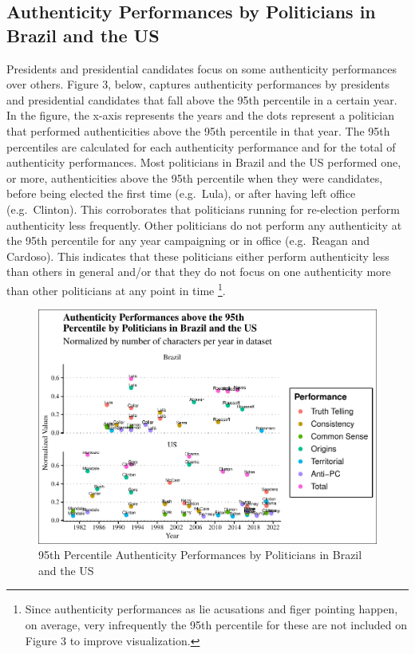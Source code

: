 \documentclass[smallextended]{svjour3}       %
\begin{document}
\hypertarget{authenticity-performances-by-politicians-in-brazil-and-the-us}{%
\subsection{Authenticity Performances by Politicians in Brazil and the
US}\label{authenticity-performances-by-politicians-in-brazil-and-the-us}}

Presidents and presidential candidates focus on some authenticity
performances over others. Figure 3, below, captures authenticity
performances by presidents and presidential candidates that fall above
the 95th percentile in a certain year. In the figure, the x-axis
represents the years and the dots represent a politician that performed
authenticities above the 95th percentile in that year. The 95th
percentiles are calculated for each authenticity performance and for the
total of authenticity performances. Most politicians in Brazil and the
US performed one, or more, authenticities above the 95th percentile when
they were candidates, before being elected the first time (e.g.~Lula),
or after having left office (e.g.~Clinton). This corroborates that
politicians running for re-election perform authenticity less
frequently. Other politicians do not perform any authenticity at the
95th percentile for any year campaigning or in office (e.g.~Reagan and
Cardoso). This indicates that these politicians either perform
authenticity less than others in general and/or that they do not focus
on one authenticity more than other politicians at any point in time
\footnote{ Since authenticity performances as lie acusations and figer
  pointing happen, on average, very infrequently the 95th percentile for
  these are not included on Figure 3 to improve visualization.}.

\begin{figure}
\centering
\includegraphics{antipc_files/figure-latex/Figure 3-1.pdf}
\caption{95th Percentile Authenticity Performances by Politicians in
Brazil and the US}
\end{figure}
\end{document}
